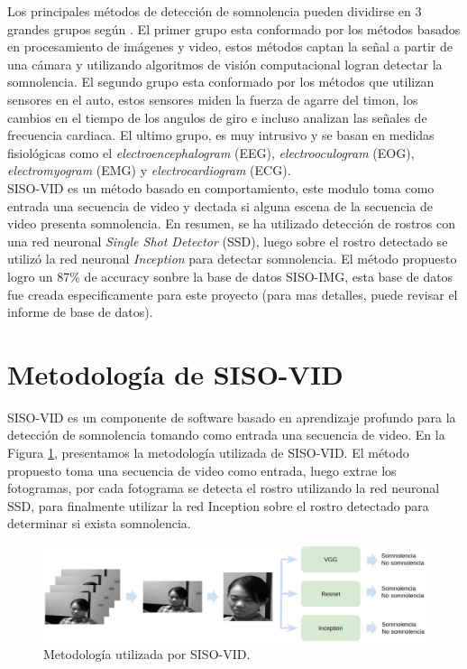 \documentclass{article}
\begin{document}
	Los principales métodos de detección de somnolencia pueden dividirse en 3 grandes grupos según \cite{ramzan2019survey}. El primer grupo esta conformado por los métodos basados en procesamiento de imágenes y video, estos métodos captan la señal a partir de una cámara y utilizando algoritmos de visión computacional logran detectar la somnolencia. El segundo grupo esta conformado por los métodos que utilizan sensores en el auto, estos sensores miden la fuerza de agarre del timon, los cambios en el tiempo de los angulos de giro e incluso analizan las señales de frecuencia cardiaca. El ultimo grupo, es muy intrusivo y se basan en medidas fisiológicas como el \textit{electroencephalogram} (EEG), \textit{electrooculogram} (EOG), \textit{electromyogram} (EMG) y \textit{electrocardiogram} (ECG).\\
	
	SISO-VID es un método basado en comportamiento, este modulo toma como entrada una secuencia de video y dectada si alguna escena de la secuencia de video presenta somnolencia. En resumen, se ha utilizado detección de rostros con una red neuronal \textit{Single Shot Detector} (SSD), luego sobre el rostro detectado se utilizó la red neuronal \textit{Inception} para detectar somnolencia. El método propuesto logro un 87\% de accuracy sonbre la base de datos SISO-IMG, esta base de datos fue creada especificamente para este proyecto (para mas detalles, puede revisar el informe de base de datos). 
	
	
	
	\section{Metodología de SISO-VID} \label{desarrollo}
	
	SISO-VID es un componente de software basado en aprendizaje profundo para la detección de somnolencia tomando como entrada una secuencia de video. En la Figura \ref{fig:siso_vid}, presentamos la metodología utilizada de SISO-VID. El método propuesto toma una secuencia de video como entrada, luego extrae los fotogramas, por cada fotograma se detecta el rostro utilizando la red neuronal SSD, para finalmente utilizar la red Inception sobre el rostro detectado para determinar si exista somnolencia.\\
	
	\begin{figure}[H]
		\includegraphics[width=\textwidth]{img/siso_vid}		
		\caption{Metodología utilizada por SISO-VID.}
		\label{fig:siso_vid}
	\end{figure}
\end{document}
